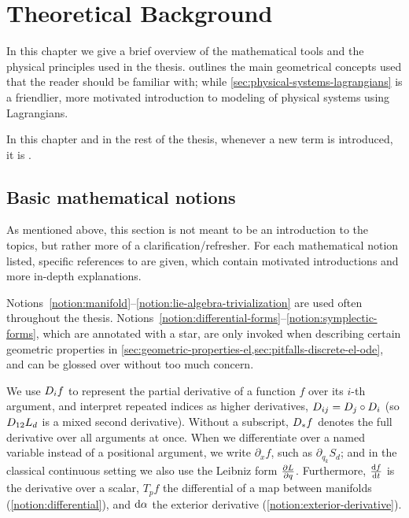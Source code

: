 \chapter{Theoretical Background}\label{sec:background}

In this chapter we give a brief overview of the mathematical tools and the physical principles used in the thesis.  outlines the main geometrical concepts used that the reader should be familiar with; while \cref{sec:physical-systems-lagrangians} is a friendlier, more motivated introduction to modeling of physical systems using Lagrangians.

In this chapter and in the rest of the thesis, whenever a new term is introduced, it is .

\section{Basic mathematical notions}\label{sec:mathematical-tools}

As mentioned above, this section is not meant to be an introduction to the topics, but rather more of a clarification/refresher. For each mathematical notion listed, specific references to \cite{leeSmoothManifolds2013} are given, which contain motivated introductions and more in-depth explanations.

Notions~\ref{notion:manifold}--\ref{notion:lie-algebra-trivialization} are used often throughout the thesis. Notions~\ref{notion:differential-forms}--\ref{notion:symplectic-forms}, which are annotated with a star, are only invoked when describing certain geometric properties in \cref{sec:geometric-properties-el,sec:pitfalls-discrete-el-ode}, and can be glossed over without too much concern.



We use $D_{i} f$ to represent the partial derivative of a function $f$ over its $i$-th argument, and interpret repeated indices as higher derivatives, $D_{ij} = D_{j} \circ D_{i}$ (so $D_{12} L_d$ is a mixed second derivative). Without a subscript, $D_{*} f$ denotes the full derivative over all arguments at once. When we differentiate over a named variable instead of a positional argument, we write $\partial_x f$, such as $\partial_{q_k} S_d$; and in the classical continuous setting we also use the Leibniz form $\pdv{L}{q}$. Furthermore, $\odv{f}{t}$ is the derivative over a scalar, $T_p f$ the differential of a map between manifolds (\ref{notion:differential}), and $\odif{\alpha}$ the exterior derivative (\ref{notion:exterior-derivative}).

